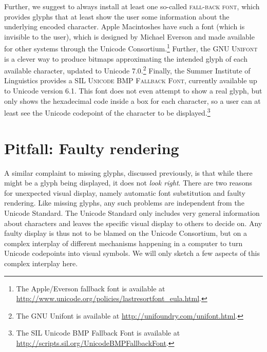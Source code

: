 Further, we suggest to always install at least one so-called \textsc{fall-back
font}, which provides glyphs that at least show the user some information about
the underlying encoded character. Apple Macintoshes have such a font (which is
invisible to the user), which is designed by Michael Everson and made available
for other systems through the Unicode Consortium.\footnote{The Apple/Everson
fallback font is available at
\url{http://www.unicode.org/policies/lastresortfont\_eula.html}.} Further, the
\textsc{GNU Unifont} is a clever way to produce bitmaps approximating the
intended glyph of each available character, updated to Unicode 7.0.\footnote{The
GNU Unifont is available at \url{http://unifoundry.com/unifont.html}.} Finally,
the Summer Institute of Linguistics provides a \textsc{SIL Unicode BMP Fallback
Font}, currently available up to Unicode version 6.1. This font does not even
attempt to show a real glyph, but only shows the hexadecimal code inside a box
for each character, so a user can at least see the Unicode codepoint of the
character to be displayed.\footnote{The SIL Unicode BMP Fallback Font is
available at \url{http://scripts.sil.org/UnicodeBMPFallbackFont}.}

\section{Pitfall: Faulty rendering} \label{pitfall-faulty-rendering}

A similar complaint to missing glyphs, discussed previously, is that while there
might be a glyph being displayed, it does not \textit{look right}. There are two
reasons for unexpected visual display, namely automatic font substitution and
faulty rendering. Like missing glyphs, any such problems are independent from
the Unicode Standard. The Unicode Standard only includes very general
information about characters and leaves the specific visual display to others to
decide on. Any faulty display is thus not to be blamed on the Unicode
Consortium, but on a complex interplay of different mechanisms happening in a
computer to turn Unicode codepoints into visual symbols. We will only sketch a
few aspects of this complex interplay here.

